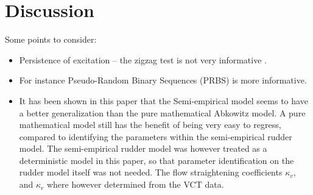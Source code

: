 \section{Discussion}
\label{sec:discussion}

Some points to consider:
\begin{itemize}
    \item Persistence of excitation -- the zigzag test is not very informative \citep{sutulo_algorithm_2014}.
    \item For instance Pseudo-Random Binary Sequences (PRBS) \citep{landau_digital_2006} is more informative.
    \item It has been shown in this paper that the Semi-empirical model seems to have a better generalization than the pure mathematical Abkowitz model. A pure mathematical model still has the benefit of being very easy to regress, compared to 
    identifying the parameters within the semi-empirical rudder model. The semi-empirical rudder model was however treated as a deterministic model in this paper, so that parameter identification on the rudder model itself was not needed. The flow straightening coefficients $\kappa_v$, and $\kappa_r$ where however determined from the VCT data.
\end{itemize}